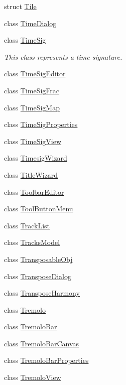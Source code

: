 \begin{DoxyCompactItemize}
struct \hyperlink{struct_ms_1_1_tile}{Tile}
\item 
class \hyperlink{class_ms_1_1_time_dialog}{Time\+Dialog}
\item 
class \hyperlink{class_ms_1_1_time_sig}{Time\+Sig}
\begin{DoxyCompactList}\small\item\em This class represents a time signature. \end{DoxyCompactList}\item 
class \hyperlink{class_ms_1_1_time_sig_editor}{Time\+Sig\+Editor}
\item 
class \hyperlink{class_ms_1_1_time_sig_frac}{Time\+Sig\+Frac}
\item 
class \hyperlink{class_ms_1_1_time_sig_map}{Time\+Sig\+Map}
\item 
class \hyperlink{class_ms_1_1_time_sig_properties}{Time\+Sig\+Properties}
\item 
class \hyperlink{class_ms_1_1_time_sig_view}{Time\+Sig\+View}
\item 
class \hyperlink{class_ms_1_1_timesig_wizard}{Timesig\+Wizard}
\item 
class \hyperlink{class_ms_1_1_title_wizard}{Title\+Wizard}
\item 
class \hyperlink{class_ms_1_1_toolbar_editor}{Toolbar\+Editor}
\item 
class \hyperlink{class_ms_1_1_tool_button_menu}{Tool\+Button\+Menu}
\item 
class \hyperlink{class_ms_1_1_track_list}{Track\+List}
\item 
class \hyperlink{class_ms_1_1_tracks_model}{Tracks\+Model}
\item 
class \hyperlink{class_ms_1_1_transposable_obj}{Transposable\+Obj}
\item 
class \hyperlink{class_ms_1_1_transpose_dialog}{Transpose\+Dialog}
\item 
class \hyperlink{class_ms_1_1_transpose_harmony}{Transpose\+Harmony}
\item 
class \hyperlink{class_ms_1_1_tremolo}{Tremolo}
\item 
class \hyperlink{class_ms_1_1_tremolo_bar}{Tremolo\+Bar}
\item 
class \hyperlink{class_ms_1_1_tremolo_bar_canvas}{Tremolo\+Bar\+Canvas}
\item 
class \hyperlink{class_ms_1_1_tremolo_bar_properties}{Tremolo\+Bar\+Properties}
\item 
class \hyperlink{class_ms_1_1_tremolo_view}{Tremolo\+View}
\item 

\end{DoxyCompactItemize}
